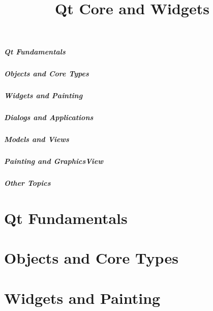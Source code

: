 \documentclass[t]{beamer}
\title{Qt Core and Widgets}
\begin{document}


\setcounter{tocdepth}{2} %
\begin{frame}
  \frametitle{Qt Fundamentals}
  \tableofcontents[part=1]
  \vspace{108pt}
\end{frame}

\begin{frame}
  \frametitle{Objects and Core Types}
  \tableofcontents[part=2]
\end{frame}

\begin{frame}
  \frametitle{Widgets and Painting}
  \tableofcontents[part=3]
\end{frame}

\begin{frame}
  \frametitle{Dialogs and Applications}
  \tableofcontents[part=4]
\end{frame}

\begin{frame}
  \frametitle{Models and Views}
  \tableofcontents[part=5]
\end{frame}

\begin{frame}
  \frametitle{Painting and GraphicsView}
  \tableofcontents[part=6]
\end{frame}

\begin{frame}
  \frametitle{Other Topics}
  \tableofcontents[part=7]
\end{frame}


\setcounter{tocdepth}{3} %

\part{Qt Fundamentals}


\part{Objects and Core Types}




\part{Widgets and Painting}


\end{document}
